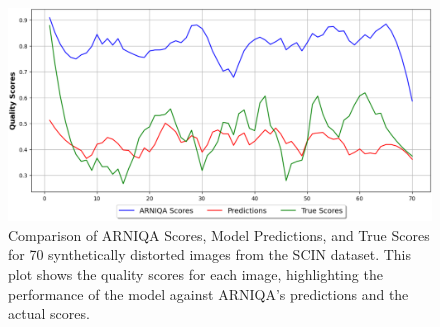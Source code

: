 \begin{figure}[ht]
    \centering
    \includegraphics[keepaspectratio,width=13cm]{img/hept/test_70_arniqa.png}
    \caption{Comparison of ARNIQA Scores, Model Predictions, and True Scores for 70 synthetically distorted images from the SCIN dataset. This plot shows the quality scores for each image, highlighting the performance of the model against ARNIQA’s predictions and the actual scores.}
    \label{fig:T7A}
\end{figure}